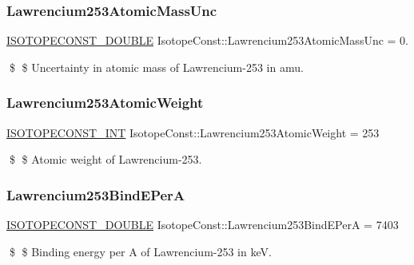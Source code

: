 \subsubsection{\texorpdfstring{Lawrencium253\+Atomic\+Mass\+Unc}{Lawrencium253AtomicMassUnc}}
{\footnotesize\ttfamily \mbox{\hyperlink{group___isotope_const-_macros_ga8f45a7272ce02c0b4c65c44636ed719a}{I\+S\+O\+T\+O\+P\+E\+C\+O\+N\+S\+T\+\_\+\+D\+O\+U\+B\+LE}} Isotope\+Const\+::\+Lawrencium253\+Atomic\+Mass\+Unc = 0.}

\$ \$ Uncertainty in atomic mass of Lawrencium-\/253 in amu. \mbox{\label{group___isotope_const-_lawrencium-_lr253_gaa88dc41ab6a39d122237b2501baa1881}} 
\subsubsection{\texorpdfstring{Lawrencium253\+Atomic\+Weight}{Lawrencium253AtomicWeight}}
{\footnotesize\ttfamily \mbox{\hyperlink{group___isotope_const-_macros_ga5f18360b3e99483a35c32d789e62621c}{I\+S\+O\+T\+O\+P\+E\+C\+O\+N\+S\+T\+\_\+\+I\+NT}} Isotope\+Const\+::\+Lawrencium253\+Atomic\+Weight = 253}

\$ \$ Atomic weight of Lawrencium-\/253. \mbox{\label{group___isotope_const-_lawrencium-_lr253_gad47f56107e7951ae9b3c2acc10168daf}} 
\subsubsection{\texorpdfstring{Lawrencium253\+Bind\+E\+PerA}{Lawrencium253BindEPerA}}
{\footnotesize\ttfamily \mbox{\hyperlink{group___isotope_const-_macros_ga8f45a7272ce02c0b4c65c44636ed719a}{I\+S\+O\+T\+O\+P\+E\+C\+O\+N\+S\+T\+\_\+\+D\+O\+U\+B\+LE}} Isotope\+Const\+::\+Lawrencium253\+Bind\+E\+PerA = 7403}

\$ \$ Binding energy per A of Lawrencium-\/253 in keV. \mbox{\label{group___isotope_const-_lawrencium-_lr253_gaf790bbf0e08e3c4f05622c6e9a0a68a3}} 
